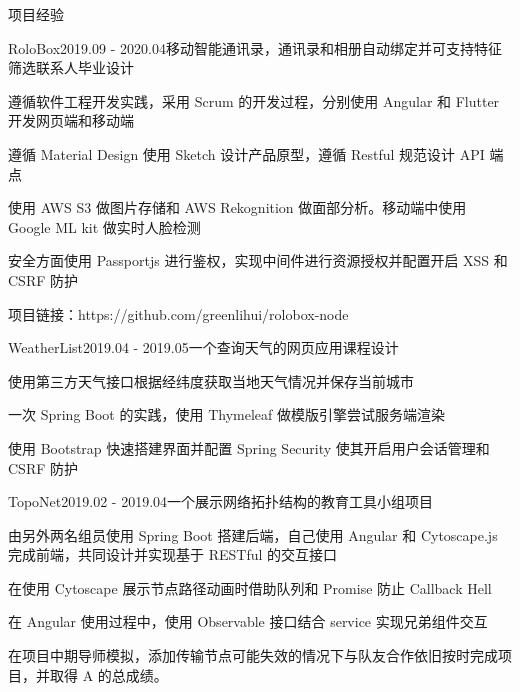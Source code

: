 \documentclass{resume} %
\begin{document}
\begin{rSection}{项目经验}

\begin{rSubsection}{RoloBox}{2019.09 - 2020.04}{移动智能通讯录，通讯录和相册自动绑定并可支持特征筛选联系人}{毕业设计}
\item 遵循软件工程开发实践，采用 Scrum 的开发过程，分别使用 Angular 和 Flutter 开发网页端和移动端
\item 遵循 Material Design 使用 Sketch 设计产品原型，遵循 Restful 规范设计 API 端点
\item 使用 AWS S3 做图片存储和 AWS Rekognition 做面部分析。移动端中使用 Google ML kit 做实时人脸检测
\item 安全方面使用 Passportjs 进行鉴权，实现中间件进行资源授权并配置开启 XSS 和 CSRF 防护
\item 项目链接：https://github.com/greenlihui/rolobox-node
\end{rSubsection}

\begin{rSubsection}{WeatherList}{2019.04 - 2019.05}{一个查询天气的网页应用}{课程设计}
\item 使用第三方天气接口根据经纬度获取当地天气情况并保存当前城市
\item 一次 Spring Boot 的实践，使用 Thymeleaf 做模版引擎尝试服务端渲染
\item 使用 Bootstrap 快速搭建界面并配置 Spring Security 使其开启用户会话管理和 CSRF 防护
\end{rSubsection}

\begin{rSubsection}{TopoNet}{2019.02 - 2019.04}{一个展示网络拓扑结构的教育工具}{小组项目}
\item 由另外两名组员使用 Spring Boot 搭建后端，自己使用 Angular 和 Cytoscape.js 完成前端，共同设计并实现基于 RESTful 的交互接口
\item 在使用 Cytoscape 展示节点路径动画时借助队列和 Promise 防止 Callback Hell
\item 在 Angular 使用过程中，使用 Observable 接口结合 service 实现兄弟组件交互
\item 在项目中期导师模拟，添加传输节点可能失效的情况下与队友合作依旧按时完成项目，并取得 A 的总成绩。
\end{rSubsection}

\end{rSection}


\end{document}
